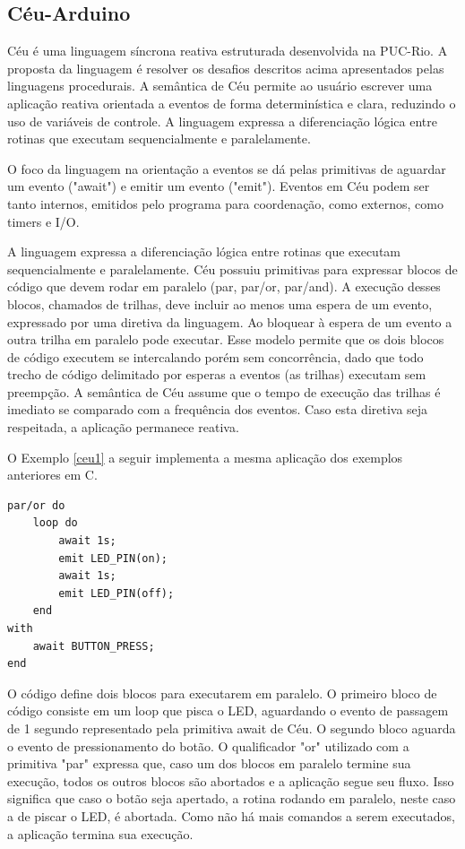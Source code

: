\documentclass{article}
\begin{document}
\subsection{Céu-Arduino}
\tab Céu é uma linguagem síncrona reativa estruturada desenvolvida na PUC-Rio. A proposta da linguagem é resolver os desafios descritos acima apresentados pelas linguagens procedurais. A semântica de Céu permite ao usuário escrever uma aplicação reativa orientada a eventos de forma determinística e clara, reduzindo o uso de variáveis de controle. A linguagem expressa a diferenciação lógica entre rotinas que executam sequencialmente e paralelamente.
\par O foco da linguagem na orientação a eventos se dá pelas primitivas de aguardar um evento ("await") e emitir um evento ("emit"). Eventos em Céu podem ser tanto internos, emitidos pelo programa para coordenação, como externos, como timers e I/O.
\par A linguagem expressa a diferenciação lógica entre rotinas que executam sequencialmente e paralelamente. Céu possuiu primitivas para expressar blocos de código que devem rodar em paralelo (par, par/or, par/and). A execução desses blocos, chamados de trilhas, deve incluir ao menos uma espera de um evento, expressado por uma diretiva da linguagem. Ao bloquear à espera de um evento a outra trilha em paralelo pode executar. Esse modelo permite que os dois blocos de código executem se intercalando porém sem concorrência, dado que todo trecho de código delimitado por esperas a eventos (as trilhas) executam sem preempção. A semântica de Céu assume que o tempo de execução das trilhas é imediato se comparado com a frequência dos eventos. Caso esta diretiva seja respeitada, a aplicação permanece reativa.
\par O Exemplo \ref{ceu1} a seguir implementa a mesma aplicação dos exemplos anteriores em C.  
\begin{lstlisting}[style=CStyle,label=ceu1,caption=Aplicação em Céu que imprime mensagem cada segundo]
par/or do
    loop do
        await 1s;
        emit LED_PIN(on);
        await 1s;
        emit LED_PIN(off);
    end
with
    await BUTTON_PRESS;
end
\end{lstlisting}
\par O código define dois blocos para executarem em paralelo. O primeiro bloco de código consiste em um loop que pisca o LED, aguardando o evento de passagem de 1 segundo representado pela primitiva await de Céu. O segundo bloco aguarda o evento de pressionamento do botão. O qualificador "or" utilizado com a primitiva "par" expressa que, caso um dos blocos em paralelo termine sua execução, todos os outros blocos são abortados e a aplicação segue seu fluxo. Isso significa que caso o botão seja apertado, a rotina rodando em paralelo, neste caso a de piscar o LED, é abortada. Como não há mais comandos a serem executados, a aplicação termina sua execução.
\end{document}
